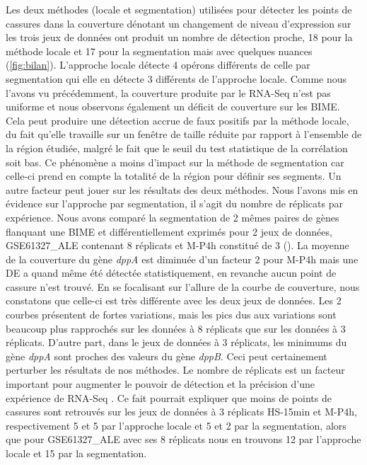 \documentclass[12pt,a4paper]{report}
\begin{document}
\begin{onehalfspace}
Les deux méthodes (locale et segmentation) utilisées pour détecter les points de cassures dans la couverture dénotant un changement de niveau d'expression sur les trois jeux de données ont produit un nombre de détection proche, 18 pour la méthode locale et 17 pour la segmentation mais avec quelques nuances (\autoref{fig:bilan}). L'approche locale détecte 4 opérons différents de celle par segmentation qui elle en détecte 3 différents de l'approche locale. Comme nous l'avons vu précédemment, la couverture produite par le RNA-Seq n'est pas uniforme et nous observons également un déficit de couverture sur les BIME. Cela peut produire une détection accrue de faux positifs par la méthode locale, du fait qu'elle travaille sur un fenêtre de taille réduite par rapport à l'ensemble de la région étudiée, malgré le fait que le seuil du test statistique de la corrélation soit bas. Ce phénomène a moins d'impact sur la méthode de segmentation car celle-ci prend en compte la totalité de la région pour définir ses segments. Un autre facteur peut jouer sur les résultats des deux méthodes. Nous l'avons mis en évidence sur l'approche par segmentation, il s'agit du nombre de réplicats par expérience. Nous avons comparé la segmentation de 2 mêmes paires de gènes flanquant une BIME et différentiellement exprimés pour 2 jeux de données, GSE61327\_ALE contenant 8 réplicats et M-P4h constitué de 3 (). La moyenne de la couverture du gène \textit{dppA} est diminuée d'un facteur 2 pour M-P4h mais une DE a quand même été détectée statistiquement, en revanche aucun point de cassure n'est trouvé. En se focalisant sur l'allure de la courbe de couverture, nous constatons que celle-ci est très différente avec les deux jeux de données. Les 2 courbes présentent de fortes variations, mais les pics dus aux variations sont beaucoup plus rapprochés sur les données à 8 réplicats que sur les données à 3 réplicats. D'autre part, dans le jeux de données à 3 réplicats, les minimums du gène \textit{dppA} sont proches des valeurs du gène \textit{dppB}. Ceci peut certainement perturber les résultats de nos méthodes. Le nombre de réplicats est un facteur important pour augmenter le pouvoir de détection et la précision  d'une expérience de RNA-Seq \citep{Liu2014}. Ce fait pourrait expliquer que moins de points de cassures sont retrouvés sur les jeux de données à 3 réplicats HS-15min et M-P4h, respectivement 5 et 5 par l'approche locale et 5 et 2 par la segmentation, alors que pour GSE61327\_ALE avec ses 8 réplicats nous en trouvons 12 par l'approche locale et 15 par la segmentation.


\end{onehalfspace}
\end{document}
